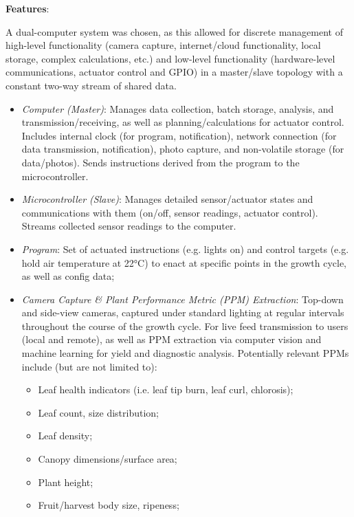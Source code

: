 \clearpage

\textbf{Features}:

A dual-computer system was chosen, as this allowed for discrete management of high-level functionality (camera capture, internet/cloud functionality, local storage, complex calculations, etc.) and low-level functionality (hardware-level communications, actuator control and GPIO) in a master/slave topology with a constant two-way stream of shared data.

\begin{itemize}
    \item \textit{Computer (Master)}: Manages data collection, batch storage, analysis, and transmission/receiving, as well as planning/calculations for actuator control. Includes internal clock (for program, notification), network connection (for data transmission, notification), photo capture, and non-volatile storage (for data/photos). Sends instructions derived from the program to the microcontroller.
    \item \textit{Microcontroller (Slave)}: Manages detailed sensor/actuator states and communications with them (on/off, sensor readings, actuator control). Streams collected sensor readings to the computer.
    \item \textit{Program}: Set of actuated instructions (e.g. lights on) and control targets (e.g. hold air temperature at 22°C) to enact at specific points in the growth cycle, as well as config data;
    \item \textit{Camera Capture \& Plant Performance Metric (PPM) Extraction}: Top-down and side-view cameras, captured under standard lighting at regular intervals throughout the course of the growth cycle. For live feed transmission to users (local and remote), as well as PPM extraction via computer vision and machine learning for yield and diagnostic analysis. Potentially relevant PPMs include (but are not limited to):
    \begin{itemize}
        \item Leaf health indicators (i.e. leaf tip burn, leaf curl, chlorosis);
        \item Leaf count, size distribution;
        \item Leaf density;
        \item Canopy dimensions/surface area;
        \item Plant height;
        \item Fruit/harvest body size, ripeness;
    \end{itemize}

\end{itemize}
